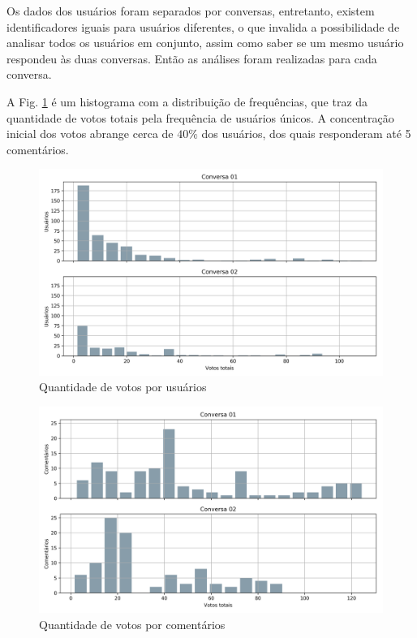 Os dados dos usuários foram separados por conversas, entretanto, existem identificadores iguais para usuários diferentes, o que invalida a possibilidade de analisar todos os usuários em conjunto, assim como saber se um mesmo usuário respondeu às duas conversas. Então as análises foram realizadas para cada conversa.

A Fig. \ref{fig:hist-compara-votos-conversas} é um histograma com a distribuição de frequências, que traz da quantidade de votos totais pela frequência de usuários únicos.  
A concentração inicial dos votos abrange cerca de $40\%$ dos usuários, dos quais responderam até 5 comentários. %


\begin{figure}[!h]
	\centering
	\includegraphics[keepaspectratio=true,scale=0.60]{figuras/tcc2/histogram_comparative_votes_per_user.png}
	\caption{Quantidade de votos por usuários}
	\label{fig:hist-compara-votos-conversas}
\end{figure}


\begin{figure}[!h]
	\centering
	\includegraphics[keepaspectratio=true,scale=0.60]{figuras/tcc2/histogram_comparative_votes_per_comment.png}
	\caption{Quantidade de votos por comentários}
	\label{fig:hist-compara-votos-comentarios}
\end{figure}


